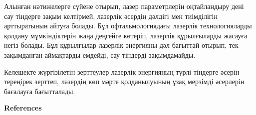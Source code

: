 \begin{multicols}{2}
Алынған нәтижелерге сүйене отырып, лазер параметрлерін оңтайландыру дені
сау тіндерге зақым келтірмей, лазерлік әсердің дәлдігі мен тиімділігін
арттыратынын айтуға болады. Бұл офтальмологиядағы лазерлік
технологияларды қолдану мүмкіндіктерін жаңа деңгейге көтеріп, лазерлік
құрылғыларды жасауға негіз болады. Бұл құрылғылар лазерлік энергияны дәл
бағыттай отырып, тек зақымданған аймақтарды емдейді, сау тіндерді
зақымдамайды.

Келешекте жүргізілетін зерттеулер лазерлік энергияның түрлі тіндерге
әсерін тереңірек зерттеп, лазердің көп мәрте қолданылуының ұзақ мерзімді
әсерлерін бағалауға бағытталады.
\end{multicols}

\begin{center}
{\bfseries References}
\end{center}

